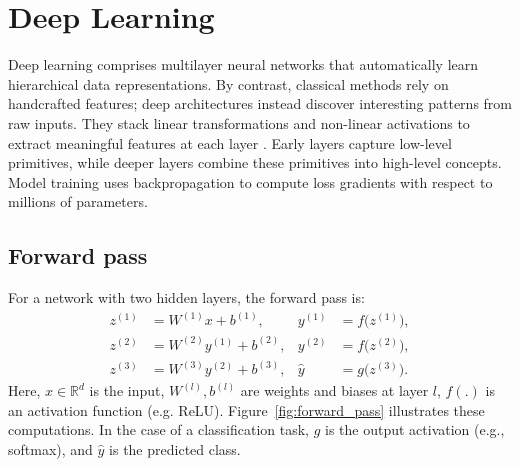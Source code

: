 



\section{Deep Learning} 
\label{sec:deep_learning}

Deep learning comprises multilayer neural networks that automatically learn hierarchical data representations. By contrast, classical methods rely on handcrafted features; deep architectures instead discover interesting patterns from raw inputs. They stack linear transformations and non-linear activations to extract meaningful features at each layer \cite{lecun_deep_learning_2015}. 
Early layers capture low-level primitives, while deeper layers combine these primitives into high-level concepts. Model training uses backpropagation to compute loss gradients with respect to millions of parameters. 

\subsection{Forward pass}
For a network with two hidden layers, the forward pass is:
\begin{align}
z^{(1)} &= W^{(1)} x + b^{(1)}, & y^{(1)} &= f\bigl(z^{(1)}\bigr), \\
z^{(2)} &= W^{(2)} y^{(1)} + b^{(2)}, & y^{(2)} &= f\bigl(z^{(2)}\bigr), \\
z^{(3)} &= W^{(3)} y^{(2)} + b^{(3)}, & \hat{y} &= g\bigl(z^{(3)}\bigr).
\end{align}
Here, \(x\in\mathbb{R}^d\) is the input, \(W^{(l)},b^{(l)}\) are weights and biases at layer \(l\), \(f(.)\) is an activation function (e.g. ReLU). Figure~\ref{fig:forward_pass} illustrates these computations. In the case of a classification task, \(g\) is the output activation (e.g., softmax), and \(\hat{y}\) is the predicted class.

